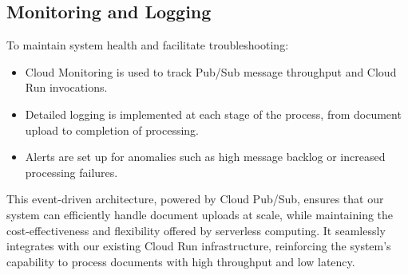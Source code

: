 \documentclass[a4paper, 12pt]{report}
\begin{document}
\subsection{Monitoring and Logging}
To maintain system health and facilitate troubleshooting:

\begin{itemize}
    \item Cloud Monitoring is used to track Pub/Sub message throughput and Cloud Run invocations.
    \item Detailed logging is implemented at each stage of the process, from document upload to completion of processing.
    \item Alerts are set up for anomalies such as high message backlog or increased processing failures.
\end{itemize}

This event-driven architecture, powered by Cloud Pub/Sub, ensures that our system can efficiently handle document uploads at scale, while maintaining the cost-effectiveness and flexibility offered by serverless computing. It seamlessly integrates with our existing Cloud Run infrastructure, reinforcing the system's capability to process documents with high throughput and low latency.
\end{document}

